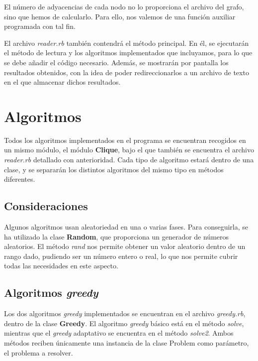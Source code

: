 El número de adyacencias de cada nodo no lo proporciona el archivo del grafo,
sino que hemos de calcularlo. Para ello, nos valemos de una función auxiliar
programada con tal fin.

El archivo \textit{reader.rb} también contendrá el método principal. En él, se
ejecutarán el método de lectura y los algoritmos implementados que incluyamos,
para lo que se debe añadir el código necesario. Además, se mostrarán por pantalla
los resultados obtenidos, con la idea de poder redireccionarlos a un archivo de
texto en el que almacenar dichos resultados.


\section{Algoritmos}

Todos los algoritmos implementados en el programa se encuentran recogidos en
un mismo módulo, el módulo \textbf{Clique}, bajo el que también se encuentra el
archivo \textit{reader.rb} detallado con anterioridad. Cada tipo de algoritmo
estará dentro de una clase, y se separarán los distintos algoritmos del mismo
tipo en métodos diferentes.

\subsection{Consideraciones}

Algunos algoritmos usan aleatoriedad en una o varias fases. Para conseguirla, se
ha utilizado la clase \textbf{Random}, que proporciona un generador de números
aleatorios. El método \textit{rand} nos permite obtener un valor aleatorio
dentro de un rango dado, pudiendo ser un número entero o real, lo que nos permite
cubrir todas las necesidades en este aspecto.


\subsection{Algoritmos \textit{greedy}}

Los dos algoritmos \textit{greedy} implementados se encuentran en el archivo
\textit{greedy.rb}, dentro de la clase \textbf{Greedy}. El algoritmo \textit{greedy}
básico está en el método \textit{solve}, mientras que el \textit{greedy} adaptativo
se encuentra en el método \textit{solve2}. Ambos métodos reciben únicamente una
instancia de la clase Problem como parámetro, el problema a resolver.

